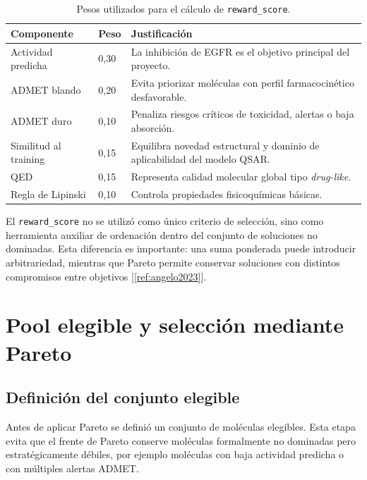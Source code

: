 \documentclass[IB]{TFUOC}%
\begin{document}
\begin{table}[H]
    \centering
    \small
    \begin{tabular}{p{5cm} p{2cm} p{6cm}}
        \hline
        \textbf{Componente} & \textbf{Peso} & \textbf{Justificación} \\
        \hline
        Actividad predicha & 0,30 & La inhibición de EGFR es el objetivo principal del proyecto. \\
       
        ADMET blando & 0,20 & Evita priorizar moléculas con perfil farmacocinético desfavorable. \\
      
        ADMET duro & 0,10 & Penaliza riesgos críticos de toxicidad, alertas o baja absorción. \\
     
        Similitud al training & 0,15 & Equilibra novedad estructural y dominio de aplicabilidad del modelo QSAR. \\
 
        QED & 0,15 & Representa calidad molecular global tipo \textit{drug-like}. \\
  
        Regla de Lipinski & 0,10 & Controla propiedades fisicoquímicas básicas. \\
        \hline
    \end{tabular}
    \caption{Pesos utilizados para el cálculo de \texttt{reward\_score}.}
    \label{tab:pesos_reward}
\end{table}

El \texttt{reward\_score} no se utilizó como único criterio de selección, sino como herramienta auxiliar de ordenación dentro del conjunto de soluciones no dominadas. Esta diferencia es importante: una suma ponderada puede introducir arbitrariedad, mientras que Pareto permite conservar soluciones con distintos compromisos entre objetivos [\ref{ref:angelo2023}].

\section{Pool elegible y selección mediante Pareto}

\subsection{Definición del conjunto elegible}

Antes de aplicar Pareto se definió un conjunto de moléculas elegibles. Esta etapa evita que el frente de Pareto conserve moléculas formalmente no dominadas pero estratégicamente débiles, por ejemplo moléculas con baja actividad predicha o con múltiples alertas ADMET.
\end{document}
